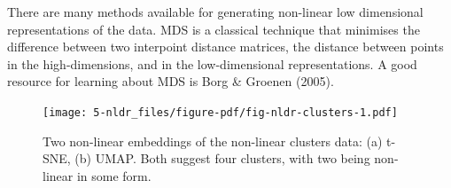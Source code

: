 \documentclass[
  letterpaper,
]{krantz}
\newenvironment{Shaded}{\begin{snugshade}}{\end{snugshade}}
\newcommand{\AttributeTok}[1]{\textcolor[rgb]{0.40,0.45,0.13}{#1}}
\newcommand{\DecValTok}[1]{\textcolor[rgb]{0.68,0.00,0.00}{#1}}
\newcommand{\FunctionTok}[1]{\textcolor[rgb]{0.28,0.35,0.67}{#1}}
\newcommand{\NormalTok}[1]{\textcolor[rgb]{0.00,0.23,0.31}{#1}}
\newcommand{\OtherTok}[1]{\textcolor[rgb]{0.00,0.23,0.31}{#1}}
\newcommand{\SpecialCharTok}[1]{\textcolor[rgb]{0.37,0.37,0.37}{#1}}
\newcommand{\StringTok}[1]{\textcolor[rgb]{0.13,0.47,0.30}{#1}}
\begin{document}
There are many methods available for generating non-linear low
dimensional representations of the data. MDS is a classical technique
that minimises the difference between two interpoint distance matrices,
the distance between points in the high-dimensions, and in the
low-dimensional representations. A good resource for learning about MDS
is Borg \& Groenen (2005).

\begin{Shaded}
\end{Shaded}

\begin{figure}[H]

{\centering \texttt{[image: 5-nldr\_files/figure-pdf/fig-nldr-clusters-1.pdf]}

}

\caption{\label{fig-nldr-clusters}Two non-linear embeddings of the
non-linear clusters data: (a) t-SNE, (b) UMAP. Both suggest four
clusters, with two being non-linear in some form.}

\end{figure}
\end{document}
